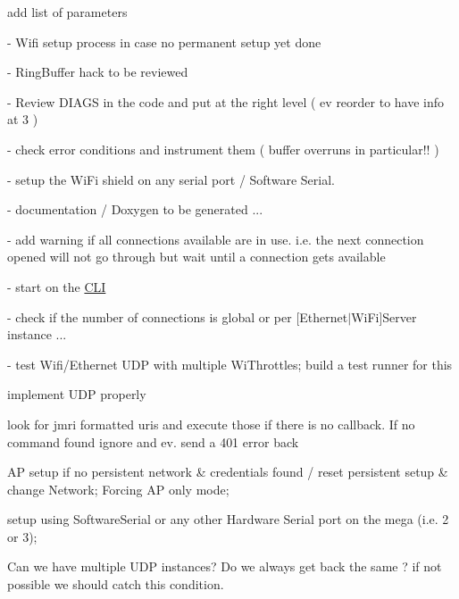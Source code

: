 
\begin{DoxyRefList}
\item[Member \mbox{\hyperlink{class_http_request_a42b01e8d23e15e65ad9c712922a6a812}{Http\+Request\+::Http\+Request}} ()]\label{todo__todo000001}%
%
add list of parameters 
\item[" ]\label{todo__todo000002}%
%
-\/ Wifi setup process in case no permanent setup yet done 

-\/ Ring\+Buffer hack to be reviewed 

-\/ Review D\+I\+A\+GS in the code and put at the right level ( ev reorder to have info at 3 ) 

-\/ check error conditions and instrument them ( buffer overruns in particular!! ) 

-\/ setup the Wi\+Fi \textquotesingle{}shield\textquotesingle{} on any serial port / Software Serial. 

-\/ documentation / Doxygen to be generated ... 

-\/ add warning if all connections available are in use. i.\+e. the next connection opened will not go through but wait until a connection gets available 

-\/ start on the \mbox{\hyperlink{class_c_l_i}{C\+LI}} 

-\/ check if the number of connections is global or per \mbox{[}Ethernet$\vert$\+Wi\+Fi\mbox{]}Server instance ... 

\label{todo__todo000003}%
%
-\/ test Wifi/\+Ethernet U\+DP with multiple Wi\+Throttles; build a test runner for this 

\label{todo__todo000004}%
%
implement U\+DP properly 
\item[Member \mbox{\hyperlink{_transport_processor_8cpp_adffd99c797adf573a9d65073d1595d53}{http\+Processor}} (\mbox{\hyperlink{struct_connection}{Connection}} $\ast$c, \mbox{\hyperlink{class_transport_processor}{Transport\+Processor}} $\ast$t)]\label{todo__todo000005}%
%
look for jmri formatted uris and execute those if there is no callback. If no command found ignore and ev. send a 401 error back  
\item[Member \mbox{\hyperlink{class_wifi_setup_a63c1e8056faee13a274a941c59549907}{Wifi\+Setup\+::setup}} ()]\label{todo__todo000006}%
%
AP setup if no persistent network \& credentials found / reset persistent setup \& change Network; Forcing AP only mode; 

\label{todo__todo000007}%
%
setup using Software\+Serial or any other Hardware Serial port on the mega (i.\+e. 2 or 3);

\label{todo__todo000008}%
%
Can we have multiple U\+DP instances? Do we always get back the same ? if not possible we should catch this condition. 
\end{DoxyRefList}